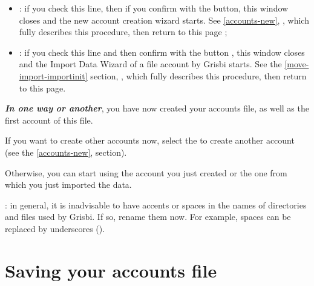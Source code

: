 \begin{enumerate}
\begin{itemize}
\item {} : if you check this line, then if you confirm with the  button, this window closes and the new account creation wizard starts. See  \vref{accounts-new}, ,  which fully describes this procedure, then return to this page ;

\item {} : if you check this line and then confirm with the  button ,  this window closes and the Import Data Wizard of a file account by Grisbi starts. See the \vref{move-import-importinit} section, , which fully describes this procedure, then return to this page.
\end{itemize}
\end{enumerate}

\label{start-newfile-end}

\textit{\textbf{In one way or another}}, you have now created your accounts file, as well as the first account of this file.


If you want to create other accounts now, select the  to create another account (see the \vref{accounts-new},  section).


Otherwise, you can start using the account you just created or the one from which you just imported the data.


 : in general, it is inadvisable to have accents or spaces in the names of directories and files used by Grisbi. If so, rename them now. For example, spaces can be replaced by underscores (\underline{}).

\newpage


\section{Saving your accounts file\label{start-save}}

